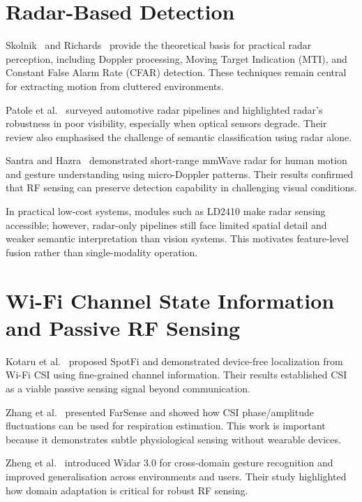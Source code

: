 \section{Radar-Based Detection}

Skolnik~\cite{skolnik2008radar} and Richards~\cite{richards2014principles} provide the theoretical basis for practical radar perception, including Doppler processing, Moving Target Indication (MTI), and Constant False Alarm Rate (CFAR) detection. These techniques remain central for extracting motion from cluttered environments.

Patole et al.~\cite{patole2017automotive} surveyed automotive radar pipelines and highlighted radar's robustness in poor visibility, especially when optical sensors degrade. Their review also emphasised the challenge of semantic classification using radar alone.

Santra and Hazra~\cite{santra2020short} demonstrated short-range mmWave radar for human motion and gesture understanding using micro-Doppler patterns. Their results confirmed that RF sensing can preserve detection capability in challenging visual conditions.

In practical low-cost systems, modules such as LD2410 make radar sensing accessible; however, radar-only pipelines still face limited spatial detail and weaker semantic interpretation than vision systems. This motivates feature-level fusion rather than single-modality operation.

\section{Wi-Fi Channel State Information and Passive RF Sensing}

Kotaru et al.~\cite{kotaru2015spotfi} proposed SpotFi and demonstrated device-free localization from Wi-Fi CSI using fine-grained channel information. Their results established CSI as a viable passive sensing signal beyond communication.

Zhang et al.~\cite{zhang2019farsense} presented FarSense and showed how CSI phase/amplitude fluctuations can be used for respiration estimation. This work is important because it demonstrates subtle physiological sensing without wearable devices.

Zheng et al.~\cite{zheng2019zero} introduced Widar 3.0 for cross-domain gesture recognition and improved generalisation across environments and users. Their study highlighted how domain adaptation is critical for robust RF sensing.

